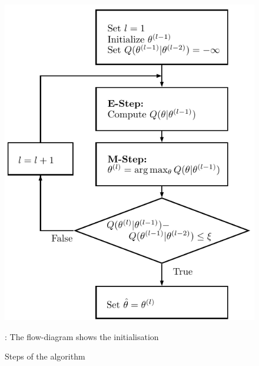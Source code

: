 \begin{figure}
\centering
\includegraphics{data/figures/em-flowchart}
\caption{Steps of the  algorithm}:
\small
The flow-diagram shows the initialisation
\end{figure}

